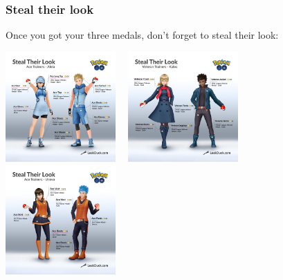 \documentclass[8pt,aspectratio=169,compress]{beamer}
\begin{document}
\begin{frame}
\frametitle{Steal their look}

\begin{tiny}
\begin{block}{}
\begin{center}
Once you got your three medals, don't forget to steal their look:

\vspace{0.2cm}

\includegraphics[width=4.2cm]{../../outfit/Alola_Ace_Trainer_2.jpg}~~
\includegraphics[width=4.2cm]{../../outfit/Kalos_Veteran_2.jpg}~~
\includegraphics[width=4.2cm]{../../outfit/Unova_Ace_Trainer_2.jpg}

\vspace{0.2cm}
\end{center}
\end{block}


\end{tiny}
\end{frame}
\end{document}
